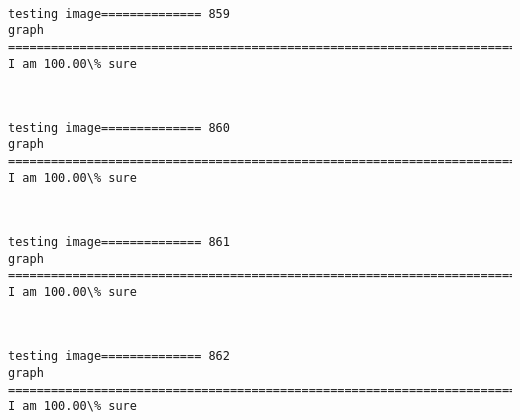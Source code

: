 \documentclass[11pt]{article}
\begin{document}
    \begin{center}
    \end{center}
    { \hspace*{\fill} \\}
    
    \begin{Verbatim}[commandchars=\\\{\}]
testing image============== 859
graph
============================================================================
I am 100.00\% sure

    \end{Verbatim}

    \begin{center}
    \end{center}
    { \hspace*{\fill} \\}
    
    \begin{Verbatim}[commandchars=\\\{\}]
testing image============== 860
graph
============================================================================
I am 100.00\% sure

    \end{Verbatim}

    \begin{center}
    \end{center}
    { \hspace*{\fill} \\}
    
    \begin{Verbatim}[commandchars=\\\{\}]
testing image============== 861
graph
============================================================================
I am 100.00\% sure

    \end{Verbatim}

    \begin{center}
    \end{center}
    { \hspace*{\fill} \\}
    
    \begin{Verbatim}[commandchars=\\\{\}]
testing image============== 862
graph
============================================================================
I am 100.00\% sure

    \end{Verbatim}
\end{document}
